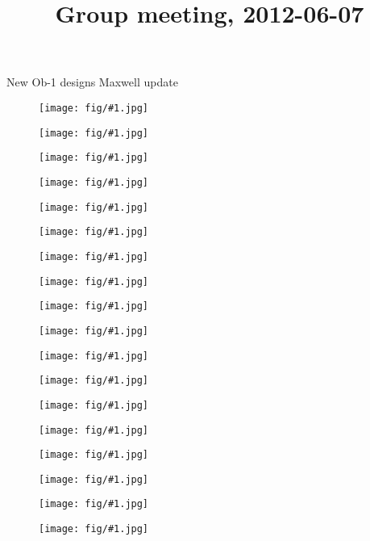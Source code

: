 \documentclass[landscape]{foils}
\title{Group meeting, 2012-06-07}
\author{}
\date{}
\newcommand{\myfig}[1]{\begin{figure}[!h]\texttt{[image: fig/\#1.jpg]}\end{figure}}
\begin{document}
\setlength{\parskip}{0cm}
\maketitle

\BIT \itemsep -1pt
\I  New Ob-1 designs
\I  Maxwell update
\EIT

\vfill

\myfig{intro}
\myfig{1}
\myfig{2}
\myfig{3}
\myfig{4}
\myfig{5}
\myfig{c1}
\myfig{c6}
\myfig{c2}
\myfig{c4}
\myfig{c7}
\myfig{c5}
\myfig{m1}
\myfig{m3}
\myfig{m4}
\myfig{m5}
\myfig{m2}
\myfig{m6}
\end{document}
